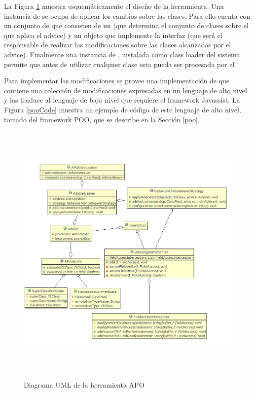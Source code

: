 		La Figura \ref{aopImage} muestra esquemáticamente el diseño de la herramienta.
		Una instancia de  se ocupa de aplicar los cambios sobre las
		clases.
		Para ello cuenta con un conjunto de  que consisten de un
		 (que determina el conjunto de clases sobre el que aplica el
		advice) y un objeto que implemente la interfaz  (que
		será el responsable de realizar las modificaciones sobre
		las clases alcanzadas por el advice).
		Finalmente una instancia de , instalada como class loader
		del sistema permite que antes de utilizar cualquier clase esta pueda ser procesada por el 
		
		Para implementar las modificaciones se provee una implementación de
		 que contiene una colección de modificaciones expresadas en un
		lenguaje de alto nivel y las traduce al lenguaje de bajo nivel que requiere el
		framework Javassist.
		La Figura \ref{pooCode} muestra un ejemplo de código de este lenguaje de alto nivel,
		tomado del framework POO, que se describe en la Sección \ref{poo}.
		
		\begin{figure}[h]
			\centering
			\includegraphics[width=500px, height=500px]{img/aop}
			\caption{Diagrama UML de la herramienta APO}
			\label{aopImage}
		\end{figure}	 
		
